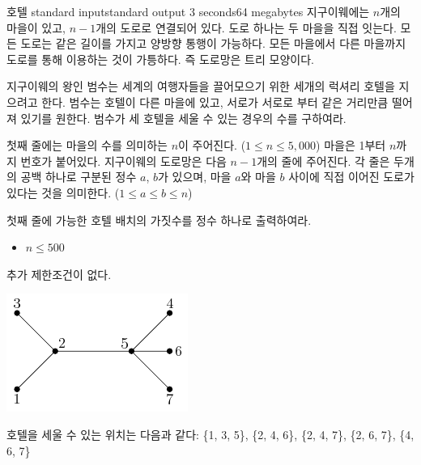 \begin{problem}{호텔}
	{standard input}{standard output}
	{3 seconds}{64 megabytes}{}
	지구이웨에는 $n$개의 마을이 있고, $n-1$개의 도로로 연결되어 있다. 도로 하나는 두 마을을 직접 잇는다. 모든 도로는 같은 길이를 가지고 양방향 통행이 가능하다. 모든 마을에서 다른 마을까지 도로를 통해 이용하는 것이 가틍하다. 즉 도로망은 트리 모양이다.
	
	지구이웨의 왕인 범수는 세계의 여행자들을 끌어모으기 위한 세개의 럭셔리 호텔을 지으려고 한다. 범수는 호텔이 다른 마을에 있고, 서로가 서로로 부터 같은 거리만큼 떨어져 있기를 원한다.
	범수가 세 호텔을 세울 수 있는 경우의 수를 구하여라.
	
	
	\InputFile
	
	첫째 줄에는 마을의 수를 의미하는 $n$이 주어진다. ($1 \le n \le 5,000$) 마을은 1부터 $n$까지 번호가 붙어있다.
	지구이웨의 도로망은 다음 $n-1$개의 줄에 주어진다. 각 줄은 두개의 공백 하나로 구분된 정수 $a$, $b$가 있으며, 마을 $a$와 마을 $b$ 사이에 직접 이어진 도로가 있다는 것을 의미한다. ($1 \le a \le b \le n$)
	
	
	\OutputFile
	첫째 줄에 가능한 호텔 배치의 가짓수를 정수 하나로 출력하여라.
	
	\begin{itemize}
		\item $n \le 500$
	\end{itemize}
	
	
	추가 제한조건이 없다.
	
	\Examples
		
	\begin{example}
	\end{example}
	
	\Notes
	
	\includegraphics[]{hot.png}
	
	호텔을 세울 수 있는 위치는 다음과 같다: \{1, 3, 5\}, \{2, 4, 6\}, \{2, 4, 7\}, \{2, 6, 7\}, \{4, 6, 7\}
	
\end{problem}

